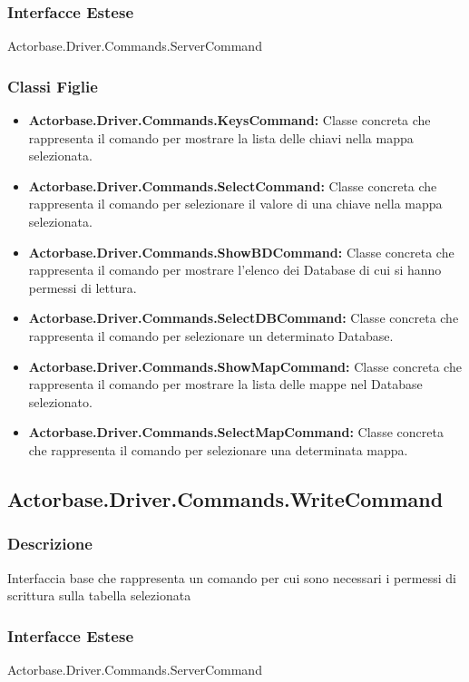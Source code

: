\documentclass[a4paper]{article}
\begin{document}
				\subsubsection{Interfacce Estese} Actorbase.Driver.Commands.ServerCommand
				\subsubsection{Classi Figlie}
					\begin{itemize}
						\item \textbf{Actorbase.Driver.Commands.KeysCommand:}
							Classe concreta che rappresenta il comando per mostrare la lista delle chiavi nella mappa selezionata.
						\item \textbf{Actorbase.Driver.Commands.SelectCommand:}
							Classe concreta che rappresenta il comando per selezionare il valore di una chiave nella mappa selezionata.
						\item \textbf{Actorbase.Driver.Commands.ShowBDCommand:}
							Classe concreta che rappresenta il comando per mostrare l'elenco dei Database di cui si hanno permessi di lettura.
						\item \textbf{Actorbase.Driver.Commands.SelectDBCommand:}
							Classe concreta che rappresenta il comando per selezionare un determinato Database.
						\item \textbf{Actorbase.Driver.Commands.ShowMapCommand:}
							Classe concreta che rappresenta il comando per mostrare la lista delle mappe nel Database selezionato.
						\item \textbf{Actorbase.Driver.Commands.SelectMapCommand:}
							Classe concreta che rappresenta il comando per selezionare una determinata mappa.
					\end{itemize}


		\subsection{Actorbase.Driver.Commands.WriteCommand}
			\subsubsection{Descrizione} Interfaccia base che rappresenta un comando per cui sono necessari i permessi di scrittura sulla tabella selezionata
			\subsubsection{Interfacce Estese} Actorbase.Driver.Commands.ServerCommand
\end{document}
